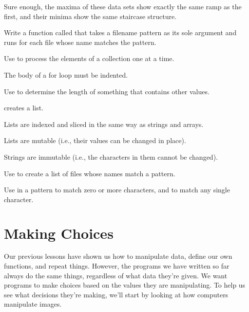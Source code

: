 Sure enough, the maxima of these data sets show exactly the same ramp as
the first, and their minima show the same staircase structure.

\begin{challenge}
  Write a function called  that takes a filename
  pattern as its sole argument and runs  for each file
  whose name matches the pattern.
\end{challenge}

\begin{keypoints}
\begin{swcitemize}
\item
  Use  to process the elements of a
  collection one at a time.
\item
  The body of a for loop must be indented.
\item
  Use  to determine the length of something that
  contains other values.
\item
   creates a list.
\item
  Lists are indexed and sliced in the same way as strings and arrays.
\item
  Lists are mutable (i.e., their values can be changed in place).
\item
  Strings are immutable (i.e., the characters in them cannot be
  changed).
\item
  Use  to create a list of files whose names
  match a pattern.
\item
  Use \code{*} in a pattern to match zero or more characters, and
   to match any single character.
\end{swcitemize}
\end{keypoints}

\section{Making Choices}

Our previous lessons have shown us how to manipulate data, define our
own functions, and repeat things. However, the programs we have written
so far always do the same things, regardless of what data they're given.
We want programs to make choices based on the values they are
manipulating. To help us see what decisions they're making, we'll start
by looking at how computers manipulate images.

